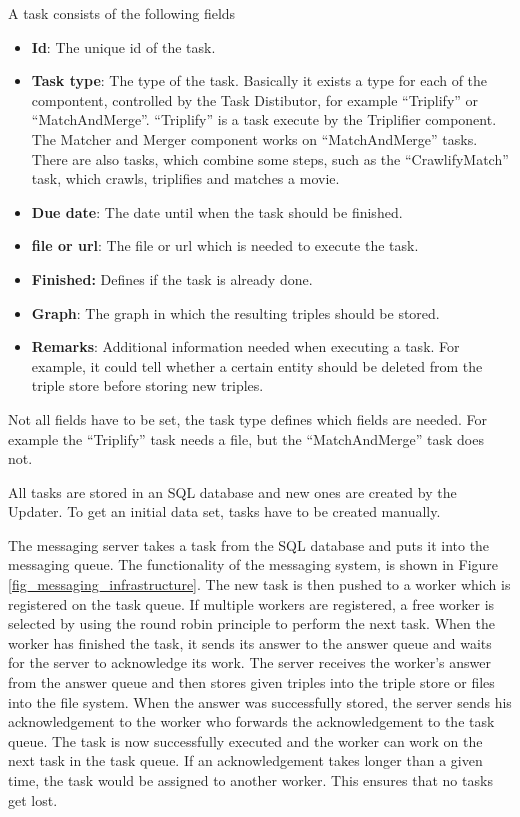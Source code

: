 A task consists of the following fields
\begin{itemize}
  \item \textbf{Id}:
  The unique id of the task.
  \item \textbf{Task type}:
   The type of the task.
  Basically it exists a type for each of the compontent, controlled by the Task Distibutor, for example ``Triplify'' or ``MatchAndMerge''.
  ``Triplify'' is a task execute by the Triplifier component.
  The Matcher and Merger component works on ``MatchAndMerge'' tasks.
  There are also tasks, which combine some steps, such as the ``CrawlifyMatch'' task, which crawls, triplifies and matches a movie.
  \item \textbf{Due date}:
  The date until when the task should be finished.
  \item \textbf{file or url}:
  The file or url which is needed to execute the task.
  \item \textbf{Finished:}
  Defines if the task is already done.
  \item \textbf{Graph}:
  The graph in which the resulting triples should be stored.
  \item \textbf{Remarks}:
  Additional information needed when executing a task.
  For example, it could tell whether a certain entity should be deleted from the triple store before storing new triples.
\end{itemize}
Not all fields have to be set, the task type defines which fields are needed.
For example the ``Triplify'' task needs a file, but the ``MatchAndMerge'' task does not.

All tasks are stored in an SQL database and new ones are created by the Updater.
To get an initial data set, tasks have to be created manually.

The messaging server takes a task from the SQL database and puts it into the messaging queue.
The functionality of the messaging system, is shown in Figure \ref{fig_messaging_infrastructure}.
The new task is then pushed to a worker which is registered on the task queue.
If multiple workers are registered, a free worker is selected by using the round robin principle to perform the next task.
When the worker has finished the task, it sends its answer to the answer queue and waits for the server to acknowledge its work.
The server receives the worker's answer from the answer queue and then stores given triples into the triple store or files into the file system.
When the answer was successfully stored, the server sends his acknowledgement to the worker who forwards the acknowledgement to the task queue.
The task is now successfully executed and the worker can work on the next task in the task queue.
If an acknowledgement takes longer than a given time, the task would be assigned to another worker.
This ensures that no tasks get lost.

